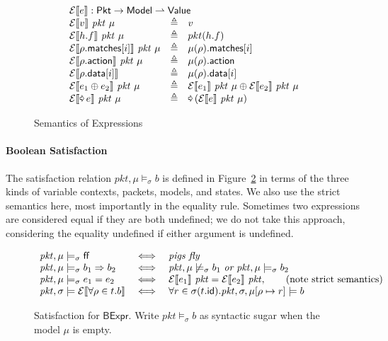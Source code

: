 \documentclass{article}
\newcommand{\pkt}{\mathit{pkt}}
\newcommand{\denote}[1]{\llbracket#1\rrbracket}
\newcommand{\edenote}[1]{\mathcal{E}\denote{#1}}
\newcommand{\FALSE}{\mathsf{ff}}
\newcommand{\binop}{\mathbin{\oplus}}
\newcommand{\unop}{\mathop{\text{\pointer}}}
\newcommand{\Value}{\mathsf{Value}}
\newcommand{\BExpr}{\mathsf{BExpr}}
\newcommand{\Pkt}{\mathsf{Pkt}}
\newcommand{\Model}{\mathsf{Model}}
\newcommand{\matches}{\mathsf{matches}}
\newcommand{\action}{\mathsf{action}}
\newcommand{\data}{\mathsf{data}}
\newcommand{\id}{\mathsf{id}}
\begin{document}
\begin{figure}[htp]
  \[\begin{array}{l>{\triangleq}cl}
  \multicolumn{3}{l}{\edenote{e} : \Pkt \to \Model \rightharpoonup \Value }\\
    \edenote{v}~\pkt~\mu &&
    v \\
    \edenote{h.f}~\pkt~\mu &&
    pkt(h.f)\\
    \edenote{\rho.\matches[i]}~\pkt~\mu &&
    \mu(\rho).\matches[i] \\
    \edenote{\rho.\action}~\pkt~\mu &&
    \mu(\rho).\action \\
    \edenote{\rho.\data[i]} &&
    \mu(\rho).\data[i]\\
    \edenote{e_1 \binop e_2}~\pkt~\mu&&
    \edenote{e_1}~\pkt~\mu \binop
    \edenote{e_2}~\pkt~\mu \\
    \edenote{\unop e}~\pkt~\mu &&
    \unop \left(\edenote{e}~\pkt~\mu\right)
  \end{array}
  \]
  \caption{Semantics of Expressions}
  \label{fig:sem-expr}
\end{figure}

\paragraph{Boolean Satisfaction}
The satisfaction relation $\pkt,\mu \models_\sigma b$ is defined in
Figure~\ref{fig:bool-satis} in terms of the three kinds of variable contexts,
packets, models, and states. We also use the strict semantics here, most
importantly in the equality rule. Sometimes two expressions are considered equal
if they are both undefined; we do not take this approach, considering the
equality undefined if either argument is undefined.

\begin{figure}
  \[\begin{array}{l>{\iff}cl}
  \pkt,\mu \models_\sigma \FALSE && \textit{pigs fly} \\
  \pkt,\mu \models_\sigma b_1 \Rightarrow b_2 &&
  \pkt,\mu \not\models_\sigma b_1~\textit{or}~
  \pkt,\mu \models_\sigma b_2\\
  \pkt,\mu \models_\sigma e_1 = e_2 &&
  \edenote{e_1}~\pkt = \edenote{e_2}~\pkt, \qquad
  \text{(note strict semantics)} \\
  \pkt,\sigma \models \edenote{\forall \rho \in t. b} &&
  \forall r \in \sigma(t.\id).
  \pkt,\sigma,\mu[\rho \mapsto r] \models b
  \end{array}
  \]
  \caption{Satisfaction for $\BExpr$. Write $\pkt \models_\sigma b$ as syntactic
    sugar when the model $\mu$ is empty.}
  \label{fig:bool-satis}
\end{figure}
\end{document}
